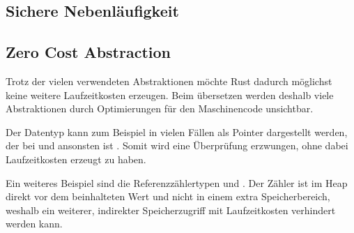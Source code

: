 


\subsection{Sichere Nebenläufigkeit}







\subsection{Zero Cost Abstraction}
\label{rust:zero_cost}

Trotz der vielen verwendeten Abstraktionen möchte Rust dadurch möglichst keine weitere Laufzeitkosten erzeugen.
Beim übersetzen werden deshalb viele Abstraktionen durch Optimierungen für den Maschinencode unsichtbar.

Der  Datentyp kann zum Beispiel in vielen Fällen als Pointer dargestellt werden, der bei   und ansonsten  ist \cite[100]{rust:orly_programming}.
Somit wird eine Überprüfung erzwungen, ohne dabei Laufzeitkosten erzeugt zu haben.

Ein weiteres Beispiel sind die Referenzzählertypen  und .
Der Zähler ist im Heap direkt vor dem beinhalteten Wert und nicht in einem extra Speicherbereich, weshalb ein weiterer, indirekter Speicherzugriff mit Laufzeitkosten verhindert werden kann.


